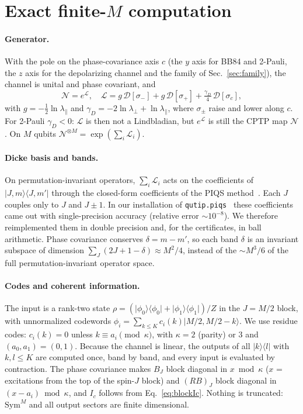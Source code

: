 \documentclass[aps,pra,reprint,superscriptaddress,nofootinbib,longbibliography,floatfix]{revtex4-2}
\theoremstyle{remark}
\newcommand{\ket}[1]{\lvert #1\rangle}
\newcommand{\bra}[1]{\langle #1\rvert}
\newcommand{\Ic}{I_c}
\newcommand{\lperp}{\lambda_\perp}
\newcommand{\lpar}{\lambda_\parallel}
\newcommand{\Sym}{\mathrm{Sym}}
\begin{document}
\section{Exact finite-$M$ computation}
\label{sec:finite}

\paragraph*{Generator.} With the pole on the phase-covariance axis $c$ (the $y$ axis for BB84 and
2-Pauli, the $z$ axis for the depolarizing channel and the family of Sec.~\ref{sec:family}), the channel
is unital and phase covariant, and
\begin{equation}
  \mathcal N=e^{\mathcal L},\quad
  \mathcal L=g\,\mathcal D[\sigma_-]+g\,\mathcal D[\sigma_+]+\tfrac{\gamma_D}{4}\,\mathcal D[\sigma_c],
  \label{eq:lindblad}
\end{equation}
with $g=-\tfrac12\ln\lpar$ and $\gamma_D=-2\ln\lperp+\ln\lpar$, where $\sigma_\pm$ raise and lower
along $c$. For 2-Pauli $\gamma_D<0$: $\mathcal L$ is then not a Lindbladian, but $e^{\mathcal L}$ is still
the CPTP map $\mathcal N$. On $M$ qubits $\mathcal N^{\otimes M}=\exp(\sum_i\mathcal L_i)$.

\paragraph*{Dicke basis and bands.} On permutation-invariant operators,
$\sum_i\mathcal L_i$ acts on the coefficients of $\ket{J,m}\bra{J,m'}$ through the closed-form
coefficients of the PIQS method~\cite{shammah2018piqs}. Each $J$ couples only to $J$ and $J\pm1$. In our
installation of \texttt{qutip.piqs}~\cite{johansson2013qutip} these coefficients came out with
single-precision accuracy (relative error $\sim10^{-8}$). We therefore reimplemented them in double
precision and, for the certificates, in ball arithmetic. Phase covariance conserves $\delta=m-m'$, so
each band $\delta$ is an invariant subspace of dimension $\sum_J(2J+1-\delta)\approx M^2/4$, instead of
the $\sim M^3/6$ of the full permutation-invariant operator space.

\paragraph*{Codes and coherent information.} The input is a rank-two state
$\rho=(\ket{\phi_0}\bra{\phi_0}+\ket{\phi_1}\bra{\phi_1})/Z$ in the $J=M/2$ block, with unnormalized
codewords $\phi_i=\sum_{k\le K}c_i(k)\ket{M/2,M/2-k}$. We use residue codes: $c_i(k)=0$ unless
$k\equiv a_i\pmod{\kappa}$, with $\kappa=2$ (parity) or $3$ and $(a_0,a_1)=(0,1)$. Because the channel
is linear, the outputs of all $\ket k\bra l$ with $k,l\le K$ are computed once, band by band, and every
input is evaluated by contraction. The phase covariance makes $B_J$ block diagonal in $x\bmod\kappa$
($x$ = excitations from the top of the spin-$J$ block) and $(RB)_J$ block diagonal in
$(x-a_i)\bmod\kappa$, and $\Ic$ follows from Eq.~\eqref{eq:blockIc}. Nothing is truncated: $\Sym^M$ and
all output sectors are finite dimensional.
\end{document}
